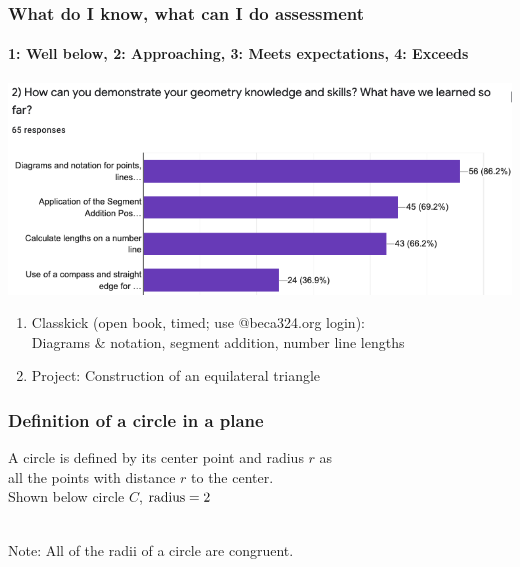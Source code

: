 \documentclass{beamer}
\begin{document}
  \frame
  {
    \frametitle{What do I know, what can I do assessment}
    \framesubtitle{1: Well below, 2: Approaching, 3: Meets expectations, 4: Exceeds}
  \includegraphics[width=.95\textwidth]{know+do-bar-chart.png}
    \begin{enumerate}
      \item Classkick (open book, timed; use @beca324.org login):\\ Diagrams \& notation, segment addition, number line lengths
      \item Project: Construction of an equilateral triangle
    \end{enumerate}
  }

  \frame
  {
    \frametitle{Definition of a circle in a plane}
      A circle is defined by its center point and radius $r$ as\\
      all the points with distance $r$ to the center. \\[0.5cm]
      Shown below circle $C$, $\rm{radius}=2$\\[0.5cm]
        \\
      Note: All of the radii of a circle are congruent.
  }
\end{document}
